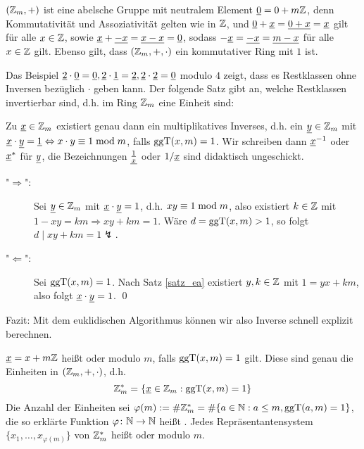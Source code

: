 \begin{folg}
	$(\mathbb{Z}_m,+)$ ist eine abelsche Gruppe mit neutralem Element $\underline{0} = 0 + m\mathbb{Z}$, denn Kommutativität und Assoziativität gelten wie in $\mathbb{Z}$, und $\underline{0} + \underline{x} = \underline{0+x} = \underline{x}$ gilt für alle $x \in \mathbb{Z}$, sowie $\underline{x} + \underline{-x} = \underline{x-x} = \underline{0}$, sodass $-\underline{x} = \underline{-x} = \underline{m-x}$ für alle $x \in \mathbb{Z}$ gilt. 
	Ebenso gilt, dass $(\mathbb{Z}_m,+,\cdot)$ ein kommutativer Ring mit $1$ ist.
\end{folg}

Das Beispiel $\underline{2} \cdot \underline{0} = \underline{0}, \underline{2} \cdot \underline{1} = \underline{2}, \underline{2} \cdot \underline{2} = \underline{0}$ modulo $4$ zeigt, dass es Restklassen ohne Inversen bezüglich $\cdot$ geben kann. 
Der folgende Satz gibt an, welche Restklassen invertierbar sind, d.h. im Ring $\ZZ_m$ eine Einheit sind:

\begin{satz}[Einheiten in $\ZZ_m$]
	Zu $\underline{x} \in \mathbb{Z}_m$ existiert genau dann ein multiplikatives Inverses, d.h. ein $\underline{y} \in \mathbb{Z}_m$ mit $\underline{x} \cdot \underline{y} = \underline{1} \Leftrightarrow x \cdot y \equiv 1 \bmod m$, falls $\operatorname{ggT}(x,m) = 1$. 
	Wir schreiben dann $\underline{x}^{-1}$ oder $\underline{x}^*$ für $\underline{y}$, die Bezeichnungen $\underline{\frac{1}{x}}$ oder $1/\underline{x}$ sind didaktisch ungeschickt.
\end{satz}

	\begin{description}
		\item["$\Rightarrow$":] Sei $\underline{y} \in \mathbb{Z}_m$ mit $\underline{x} \cdot \underline{y} = 1$, d.h. $xy \equiv 1 \bmod m$, also existiert $k \in \mathbb{Z}$ mit $1 - xy = km \Rightarrow xy + km = 1$. 
		Wäre $d = \operatorname{ggT}(x,m) > 1$, so folgt $d \mid xy + km = 1 \lightning$.
		\item["$\Leftarrow$":] Sei $\operatorname{ggT}(x,m) = 1$. 
		Nach Satz \ref{satz_ea} existiert $y,k \in \mathbb{Z}$ mit $1 = yx + km$, also folgt $\underline{x} \cdot \underline{y} = 1$. \qed
	\end{description}

Fazit: Mit dem euklidischen Algorithmus können wir also Inverse schnell explizit berechnen.

\begin{defn}
	$\underline{x} = x + m\mathbb{Z}$ heißt  oder  modulo $m$, falls $\operatorname{ggT}(x,m) = 1$ gilt. 
	Diese sind genau die Einheiten in $(\mathbb{Z}_m,+,\cdot)$, d.h.
	\[ \mathbb{Z}_m^* = \{\underline{x} \in \mathbb{Z}_m : \operatorname{ggT}(x,m) = 1\} \]
	Die Anzahl der Einheiten sei $\varphi(m) := \# \mathbb{Z}_m^* = \# \{a \in \mathbb{N} : a \leq m, \operatorname{ggT}(a,m) = 1\}$, die so erklärte Funktion $\varphi\colon \mathbb{N} \rightarrow \mathbb{N}$ heißt . 
	Jedes Repräsentantensystem $\{x_1, \dots, x_{\varphi(m)}\}$ von $\mathbb{Z}_m^*$ heißt  oder  modulo $m$.  
\end{defn}

